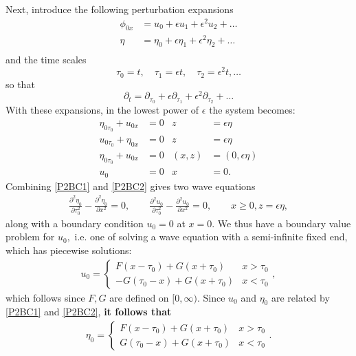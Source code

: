 \documentclass[10pt,reqno,oneside,a4paper]{article}
\begin{document}
Next, introduce the following perturbation expansions
\begin{align*}
\phi_{0x} &= u_0 + \epsilon u_1 +  \epsilon^2 u_2 + \ldots \\
\eta &= \eta_0 + \epsilon \eta_1 +  \epsilon^2 \eta_2 + \ldots \\
\end{align*}
and the time scales
\[ 
\tau_0 = t, \quad \tau_1 = \epsilon t, \quad \tau_2 = \epsilon^2 t, \ldots
\]
so that 
\[ 
\partial_t = \partial_{\tau_0} + \epsilon \partial_{\tau_1} + \epsilon^2 \partial_{\tau_2} + \ldots
\]
With these expansions, in the lowest power of $\epsilon$ the system becomes:
\begin{subequations} \label{NonDimHalfLineProb2}
\begin{align}
\label{P2BC1}\eta_{0\tau_0} + u_{0x} &=0 &z &= \epsilon\eta \\
\label{P2BC2} u_{0\tau_0} + \eta_{0x} &= 0 &z &= \epsilon\eta  \\
\label{P2BC3}\eta_{0\tau_0} +  u_{0x} &=0 &(x,z) &= (0,\epsilon\eta) \\
\label{P2BC4} u_0 &= 0 &x &= 0.
\end{align}
\end{subequations}
Combining \eqref{P2BC1} and \eqref{P2BC2} gives two wave equations
\begin{align*}
\frac{\partial^2 \eta_0}{\partial \tau_0^2} - \frac{\partial^2 \eta_0}{\partial x^2} = 0, \qquad \frac{\partial^2 u_0}{\partial \tau_0^2} - \frac{\partial^2 u_0}{\partial x^2} = 0, \qquad x\geq0, z= \epsilon \eta,
\end{align*}
along with a boundary condition $u_0 = 0$ at $x=0.$ We thus have a boundary value problem for $u_0,$ i.e. one of solving a wave equation with a semi-infinite fixed end, which has piecewise solutions:
\begin{align*}
u_0 = \begin{cases} F(x - \tau_0) + G(x+\tau_0) & x>\tau_0 \\ -G(\tau_0 - x) + G(x+\tau_0) & x< \tau_0 \end{cases},
\end{align*}
which follows since $F,G$ are defined on $[0, \infty).$ Since $u_0$ and $\eta_0$ are related by \eqref{P2BC1} and \eqref{P2BC2}, \textbf{it follows that} 
\begin{align*}
\eta_0 = \begin{cases} F(x - \tau_0) + G(x+\tau_0) & x>\tau_0 \\ G(\tau_0 - x) + G(x+\tau_0) & x< \tau_0 \end{cases}.
\end{align*}
\end{document}
